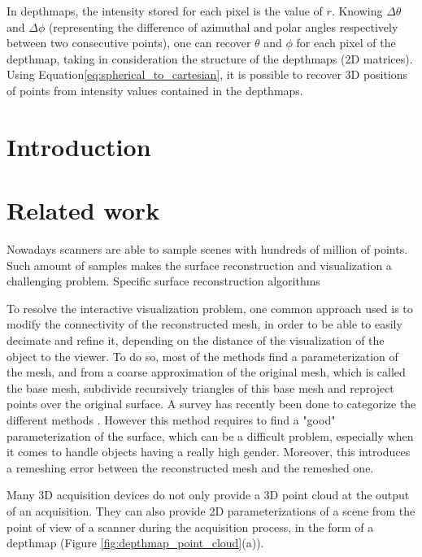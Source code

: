\documentclass[11pt,fleqn]{book} %
\begin{document}
In depthmaps, the intensity stored for each pixel is the value of $r$. Knowing $\Delta\theta$ and $\Delta\phi$ (representing the difference of azimuthal and polar angles respectively between two consecutive points), one can recover $\theta$ and $\phi$ for each pixel of the depthmap, taking in consideration the structure of the depthmaps (2D matrices). 
Using Equation\eqref{eq:spherical_to_cartesian}, it is possible to recover 3D positions of points from intensity values contained in the depthmaps.

\section{Introduction}
\label{sec:introduction}

\section{Related work}
\label{sec:related_work}

Nowadays scanners are able to sample scenes with hundreds of million of points. Such amount of samples makes the surface reconstruction and visualization a challenging problem.
Specific surface reconstruction algorithms 

To resolve the interactive visualization problem, one common approach used is to modify the connectivity of the reconstructed mesh, in order to be able to easily decimate and refine it, depending on the distance of the visualization of the object to the viewer.
To do so, most of the methods find a parameterization of the mesh, and from a coarse approximation of the original mesh, which is called the base mesh, subdivide recursively triangles of this base mesh and reproject points over the original surface. A survey has recently been done to categorize the different methods \cite{PRS15}.
However this method requires to find a "good" parameterization of the surface, which can be a difficult problem, especially when it comes to handle objects having a really high gender.
Moreover, this introduces a remeshing error between the reconstructed mesh and the remeshed one.

Many 3D acquisition devices do not only provide a 3D point cloud at the output of an acquisition. They can also provide 2D parameterizations of a scene from the point of view of a scanner during the acquisition process, in the form of a depthmap (Figure \ref{fig:depthmap_point_cloud}(a)).
\end{document}
